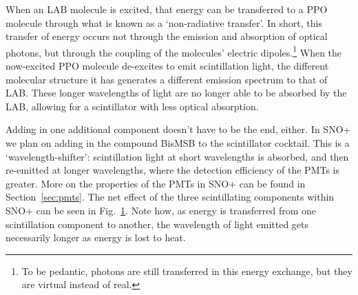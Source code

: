 When an LAB molecule is excited, that energy can be transferred to a PPO molecule through what is known as a `non-radiative transfer'. In short, this transfer of energy occurs not through the emission and absorption of optical photons, but through the coupling of the molecules' electric dipoles.\footnote{To be pedantic, photons are still transferred in this energy exchange, but they are virtual instead of real.}
When the now-excited PPO molecule de-excites to emit scintillation light, the different molecular structure it has generates a different emission spectrum to that of LAB. These longer wavelengths of light are no longer able to be absorbed by the LAB, allowing for a scintillator with less optical absorption.

Adding in one additional component doesn't have to be the end, either. In SNO+ we plan on adding in the compound BisMSB to the scintillator cocktail. This is a `wavelength-shifter': scintillation light at short wavelengths is absorbed, and then re-emitted at longer wavelengths, where the detection efficiency of the PMTs is greater. More on the properties of the PMTs in SNO+ can be found in Section~\ref{sec:pmts}. The net effect of the three scintillating components within SNO+ can be seen in Fig.~\ref{fig:scintillator_abs_emit_dist}. Note how, as energy is transferred from one scintillation component to another, the wavelength of light emitted gets necessarily longer as energy is lost to heat.

\begin{figure}
    \centering
    \caption[]{}
    \label{fig:scintillator_abs_emit_dist}
\end{figure}

